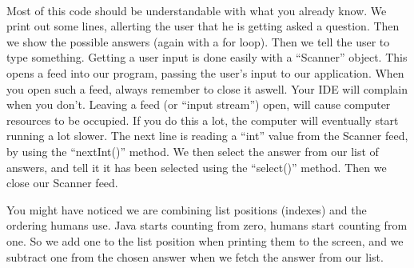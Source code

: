 \documentclass[11pt,fleqn]{book} %
\begin{document}
\paragraph{}Most of this code should be understandable with what you already know. We print out some lines, allerting the user that he is getting asked a question. Then we show the possible answers (again with a for loop). Then we tell the user to type something. Getting a user input is done easily with a ``Scanner'' object. This opens a feed into our program, passing the user's input to our application. When you open such a feed, always remember to close it aswell. Your IDE will complain when you don't. Leaving a feed (or ``input stream'') open, will cause computer resources to be occupied. If you do this a lot, the computer will eventually start running a lot slower. 
The next line is reading a ``int'' value from the Scanner feed, by using the ``nextInt()'' method. We then select the answer from our list of answers, and tell it it has been selected using the ``select()'' method. Then we close our Scanner feed.

\begin{remark}
	You might have noticed we are combining list positions (indexes) and the ordering humans use. Java starts counting from zero, humans start counting from one.
	So we add one to the list position when printing them to the screen, and we subtract one from the chosen answer when we fetch the answer from our list.
\end{remark}
\end{document}
